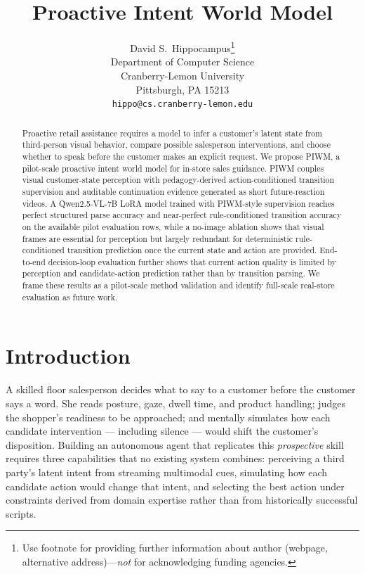 \documentclass{article}
\title{Proactive Intent World Model}
\author{%
  David S.~Hippocampus\thanks{Use footnote for providing further information
    about author (webpage, alternative address)---\emph{not} for acknowledging
    funding agencies.} \\
  Department of Computer Science\\
  Cranberry-Lemon University\\
  Pittsburgh, PA 15213 \\
  \texttt{hippo@cs.cranberry-lemon.edu} \\
}
\begin{document}
\maketitle


\begin{abstract}
  Proactive retail assistance requires a model to infer a customer's latent state from third-person visual behavior, compare possible salesperson interventions, and choose whether to speak before the customer makes an explicit request. We propose PIWM, a pilot-scale proactive intent world model for in-store sales guidance. PIWM couples visual customer-state perception with pedagogy-derived action-conditioned transition supervision and auditable continuation evidence generated as short future-reaction videos. A Qwen2.5-VL-7B LoRA model trained with PIWM-style supervision reaches perfect structured parse accuracy and near-perfect rule-conditioned transition accuracy on the available pilot evaluation rows, while a no-image ablation shows that visual frames are essential for perception but largely redundant for deterministic rule-conditioned transition prediction once the current state and action are provided. End-to-end decision-loop evaluation further shows that current action quality is limited by perception and candidate-action prediction rather than by transition parsing. We frame these results as a pilot-scale method validation and identify full-scale real-store evaluation as future work.
\end{abstract}

\section{Introduction}

A skilled floor salesperson decides what to say to a customer before the customer says a word. She reads posture, gaze, dwell time, and product handling; judges the shopper's readiness to be approached; and mentally simulates how each candidate intervention --- including silence --- would shift the customer's disposition. Building an autonomous agent that replicates this \emph{prospective} skill requires three capabilities that no existing system combines: perceiving a third party's latent intent from streaming multimodal cues, simulating how each candidate action would change that intent, and selecting the best action under constraints derived from domain expertise rather than from historically successful scripts.
\end{document}
